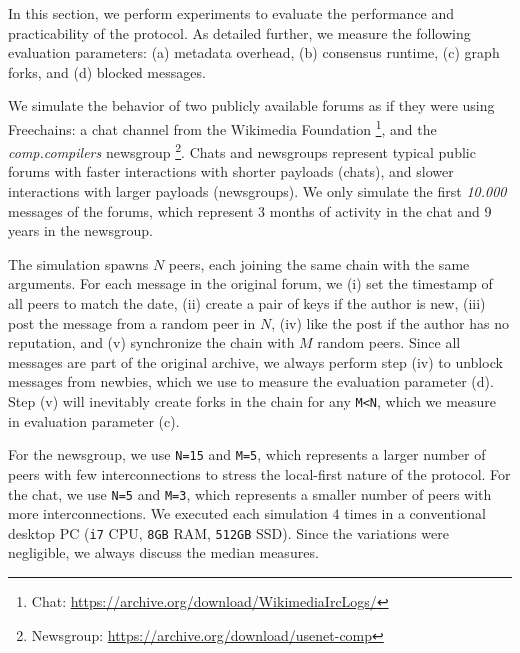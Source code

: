 \documentclass[12pt]{article}
\newcommand{\FC}       {Freechains\xspace}
\begin{document}
In this section, we perform experiments to evaluate the performance and
practicability of the protocol.
%
As detailed further, we measure the following evaluation parameters:
    (a) metadata overhead,
    (b) consensus runtime,
    (c) graph forks, and
    (d) blocked messages.

We simulate the behavior of two publicly available forums as if they were using
\FC:
%
    a chat channel from the Wikimedia Foundation%
\footnote{ Chat: \url{https://archive.org/download/WikimediaIrcLogs/} }, and
    the \emph{comp.compilers} newsgroup%
\footnote{ Newsgroup: \url{https://archive.org/download/usenet-comp} }.
%
Chats and newsgroups represent typical public forums with
    faster interactions with shorter payloads (chats), and
    slower interactions with larger payloads (newsgroups).
%
We only simulate the first \emph{10.000} messages of the forums, which
represent 3 months of activity in the chat and 9 years in the newsgroup.

The simulation spawns $N$ peers, each joining the same chain with the same
arguments.
For each message in the original forum, we
    (i)   set the timestamp of all peers to match the date,
    (ii)  create a pair of keys if the author is new,
    (iii) post the message from a random peer in $N$,
    (iv)  like the post if the author has no reputation, and
    (v)   synchronize the chain with $M$ random peers.
%
Since all messages are part of the original archive, we always perform step
(iv) to unblock messages from newbies, which we use to measure the evaluation
parameter (d).
Step (v) will inevitably create forks in the chain for any \texttt{M<N}, which
we measure in evaluation parameter (c).

For the newsgroup, we use \texttt{N=15} and \texttt{M=5}, which represents a
larger number of peers with few interconnections to stress the local-first
nature of the protocol.
For the chat, we use \texttt{N=5} and \texttt{M=3}, which represents a smaller
number of peers with more interconnections.
%
We executed each simulation $4$ times in a conventional desktop PC (\texttt{i7}
CPU, \texttt{8GB} RAM, \texttt{512GB} SSD).
Since the variations were negligible, we always discuss the median measures.

\end{document}
